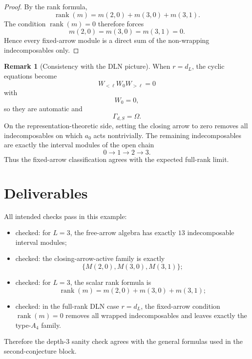 \documentclass{article}
\newcommand{\rk}{\operatorname{rank}}
\theoremstyle{definition}
\newtheorem{remark}[theorem]{Remark}
\begin{document}
\begin{proof}
By the rank formula,
\[
\rk(m)=m(2,0)+m(3,0)+m(3,1).
\]
The condition $\rk(m)=0$ therefore forces
\[
m(2,0)=m(3,0)=m(3,1)=0.
\]
Hence every fixed-arrow module is a direct sum of the non-wrapping
indecomposables only.
\end{proof}

\begin{remark}[Consistency with the DLN picture]
When $r=d_L$, the cyclic equations become
\[
W_{<\ell}W_0W_{>\ell}=0
\]
with
\[
W_0=0,
\]
so they are automatic and
\[
\Gamma_{d,S}=\Omega.
\]
On the representation-theoretic side, setting the closing arrow to zero removes
all indecomposables on which $a_0$ acts nontrivially. The remaining
indecomposables are exactly the interval modules of the open chain
\[
0\to 1\to 2\to 3.
\]
Thus the fixed-arrow classification agrees with the expected full-rank limit.
\end{remark}

\section{Deliverables}

All intended checks pass in this example:

\begin{itemize}
\item checked: for $L=3$, the free-arrow algebra has exactly $13$ indecomposable
  interval modules;
\item checked: the closing-arrow-active family is exactly
  \[
  \{M(2,0),M(3,0),M(3,1)\};
  \]
\item checked: for $L=3$, the scalar rank formula is
  \[
  \rk(m)=m(2,0)+m(3,0)+m(3,1);
  \]
\item checked: in the full-rank DLN case $r=d_L$, the fixed-arrow condition
  $\rk(m)=0$ removes all wrapped indecomposables and leaves exactly the
  type-$A_4$ family.
\end{itemize}

Therefore the depth-$3$ sanity check agrees with the general formulas used in
the second-conjecture block.
\end{document}
